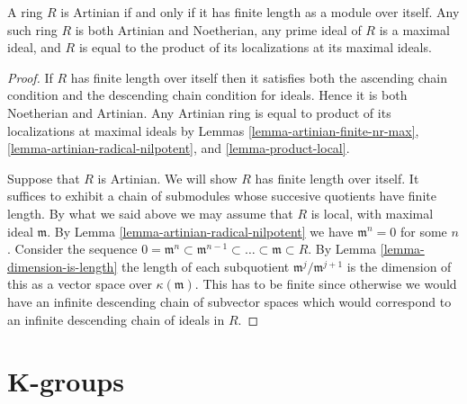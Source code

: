\begin{lemma}
\label{lemma-artinian-finite-length}
A ring $R$ is Artinian if and only if it has finite length
as a module over itself. Any such ring $R$ is both Artinian and
Noetherian, any prime ideal of $R$ is a maximal ideal, and $R$ is equal
to the product of its localizations at its maximal ideals.
\end{lemma}

\begin{proof}
If $R$ has finite length over itself then it satisfies both
the ascending chain condition and the descending chain
condition for ideals. Hence it is both Noetherian and Artinian.
Any Artinian ring is equal to product of its localizations
at maximal ideals by Lemmas \ref{lemma-artinian-finite-nr-max},
\ref{lemma-artinian-radical-nilpotent}, and \ref{lemma-product-local}.

\medskip\noindent
Suppose that $R$ is Artinian. We will show $R$ has finite
length over itself. It suffices to exhibit a chain of
submodules whose succesive quotients have finite length.
By what we said above
we may assume that $R$ is local, with maximal ideal $\mathfrak m$.
By Lemma \ref{lemma-artinian-radical-nilpotent} we have
$\mathfrak m^n =0$ for some $n$.
Consider the sequence
$0 = \mathfrak m^n \subset \mathfrak m^{n-1} \subset
\ldots \subset \mathfrak m \subset R$. By Lemma
\ref{lemma-dimension-is-length} the length of each subquotient
$\mathfrak m^j/\mathfrak m^{j + 1}$ is the dimension of this
as a vector space over $\kappa(\mathfrak m)$. This has to be
finite since otherwise we would have an infinite descending
chain of subvector spaces which would correspond to an
infinite descending chain of ideals in $R$.
\end{proof}






































\section{K-groups}
\label{section-K-groups}

